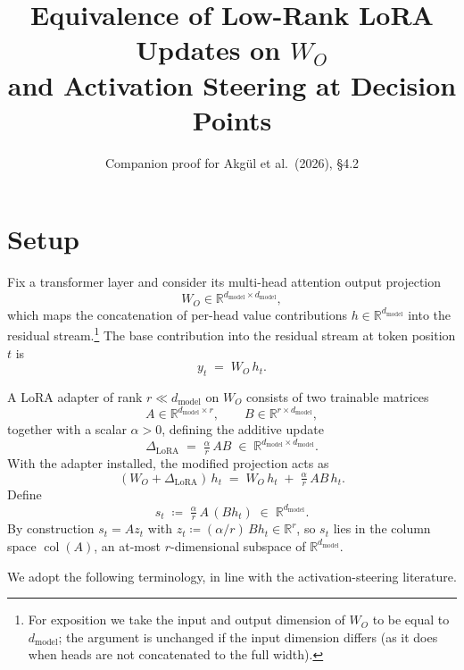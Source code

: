 \documentclass[11pt]{article}
\title{Equivalence of Low-Rank LoRA Updates on $W_O$ \\ and Activation Steering at Decision Points}
\author{Companion proof for Akg\"{u}l et al.\ (2026), \S 4.2}
\date{}
\begin{document}
\maketitle

\section*{Setup}

Fix a transformer layer and consider its multi-head attention output projection
\[
W_O \in \mathbb{R}^{d_{\mathrm{model}} \times d_{\mathrm{model}}},
\]
which maps the concatenation of per-head value contributions $h \in \mathbb{R}^{d_{\mathrm{model}}}$ into the residual stream.\footnote{For exposition we take the input and output dimension of $W_O$ to be equal to $d_{\mathrm{model}}$; the argument is unchanged if the input dimension differs (as it does when heads are not concatenated to the full width).} The base contribution into the residual stream at token position $t$ is
\[
y_t \;=\; W_O \, h_t.
\]

A LoRA adapter of rank $r \ll d_{\mathrm{model}}$ on $W_O$ consists of two trainable matrices
\[
A \in \mathbb{R}^{d_{\mathrm{model}} \times r}, \qquad B \in \mathbb{R}^{r \times d_{\mathrm{model}}},
\]
together with a scalar $\alpha > 0$, defining the additive update
\begin{equation}
\Delta_{\mathrm{LoRA}} \;=\; \tfrac{\alpha}{r}\, A B \;\in\; \mathbb{R}^{d_{\mathrm{model}} \times d_{\mathrm{model}}}.
\label{eq:lora-def}
\end{equation}
With the adapter installed, the modified projection acts as
\begin{equation}
(W_O + \Delta_{\mathrm{LoRA}})\, h_t
\;=\; W_O\, h_t \;+\; \tfrac{\alpha}{r}\, A B\, h_t.
\label{eq:additive}
\end{equation}
Define
\begin{equation}
s_t \;\coloneqq\; \tfrac{\alpha}{r}\, A\, (B h_t) \;\in\; \mathbb{R}^{d_{\mathrm{model}}}.
\label{eq:s-def}
\end{equation}
By construction $s_t = A z_t$ with $z_t \coloneqq (\alpha/r)\, B h_t \in \mathbb{R}^r$, so $s_t$ lies in the column space $\operatorname{col}(A)$, an at-most $r$-dimensional subspace of $\mathbb{R}^{d_{\mathrm{model}}}$.

\medskip

We adopt the following terminology, in line with the activation-steering literature.
\end{document}
